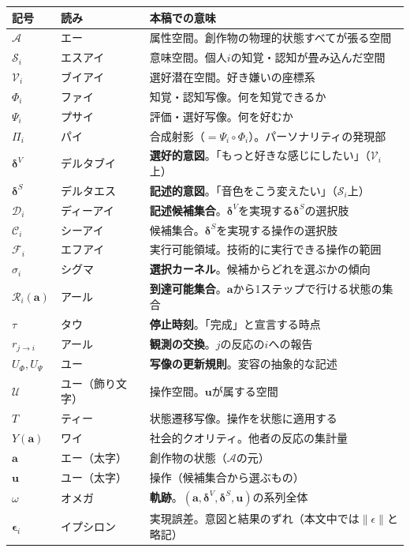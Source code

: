 \documentclass[a4paper, fontsize=10pt]{jlreq}
\newcommand{\va}{\bm{a}}
\newcommand{\vu}{\bm{u}}
\newcommand{\A}{\mathcal{A}}
\newcommand{\Si}{\mathcal{S}_i}
\newcommand{\Vi}{\mathcal{V}_i}
\newcommand{\Phii}{\Phi_i}
\newcommand{\Psii}{\Psi_i}
\newcommand{\Ci}{\mathcal{C}_i}
\newcommand{\Fi}{\mathcal{F}_i}
\newcommand{\U}{\mathcal{U}}
\newcommand{\dV}{\bm{\delta}^{V}}          %
\newcommand{\dS}{\bm{\delta}^{S}}          %
\newcommand{\Di}{\mathcal{D}_i}            %
\newcommand{\Ri}{\mathcal{R}_i}            %
\newcommand{\traj}{\omega}                 %
\begin{document}
{\small
\begin{tabular}{@{}llp{70mm}@{}}
\toprule
記号 & 読み & 本稿での意味 \\
\midrule
$\A$ & エー & 属性空間。創作物の物理的状態すべてが張る空間 \\
$\Si$ & エスアイ & 意味空間。個人$i$の知覚・認知が畳み込んだ空間 \\
$\Vi$ & ブイアイ & 選好潜在空間。好き嫌いの座標系 \\
$\Phii$ & ファイ & 知覚・認知写像。何を知覚できるか \\
$\Psii$ & プサイ & 評価・選好写像。何を好むか \\
$\Pi_i$ & パイ & 合成射影（$= \Psii \circ \Phii$）。パーソナリティの発現部 \\
$\dV$ & デルタブイ & \textbf{選好的意図}。「もっと好きな感じにしたい」（$\Vi$上）\\
$\dS$ & デルタエス & \textbf{記述的意図}。「音色をこう変えたい」（$\Si$上）\\
$\Di$ & ディーアイ & \textbf{記述候補集合}。$\dV$を実現する$\dS$の選択肢 \\
$\Ci$ & シーアイ & 候補集合。$\dS$を実現する操作の選択肢 \\
$\Fi$ & エフアイ & 実行可能領域。技術的に実行できる操作の範囲 \\
$\sigma_i$ & シグマ & \textbf{選択カーネル}。候補からどれを選ぶかの傾向 \\
$\Ri(\va)$ & アール & \textbf{到達可能集合}。$\va$から1ステップで行ける状態の集合 \\
$\tau$ & タウ & \textbf{停止時刻}。「完成」と宣言する時点 \\
$r_{j \to i}$ & アール & \textbf{観測の交換}。$j$の反応の$i$への報告 \\
$U_\Phi, U_\Psi$ & ユー & \textbf{写像の更新規則}。変容の抽象的な記述 \\
$\U$ & ユー（飾り文字） & 操作空間。$\vu$が属する空間 \\
$T$ & ティー & 状態遷移写像。操作を状態に適用する \\
$Y(\va)$ & ワイ & 社会的クオリティ。他者の反応の集計量 \\
$\va$ & エー（太字） & 創作物の状態（$\A$の元） \\
$\vu$ & ユー（太字） & 操作（候補集合から選ぶもの） \\
$\traj$ & オメガ & \textbf{軌跡}。$(\va, \dV, \dS, \vu)$の系列全体 \\
$\bm{\epsilon}_i$ & イプシロン & 実現誤差。意図と結果のずれ（本文中では$\lVert\epsilon\rVert$と略記） \\
\bottomrule
\end{tabular}
}
\end{document}
